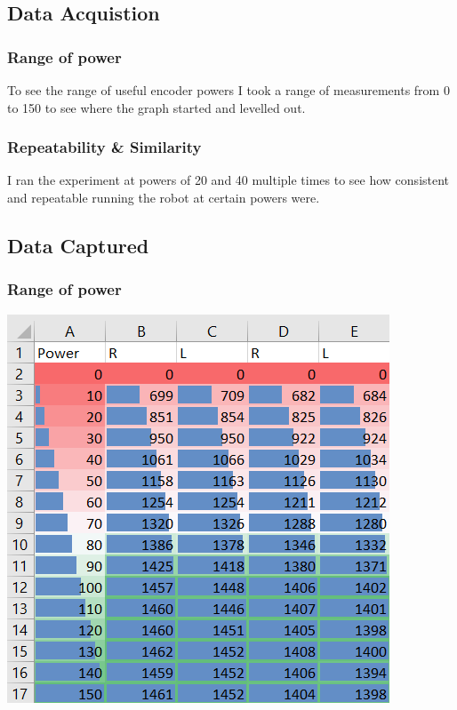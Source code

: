 \documentclass[11pt,a4paper,titlepage]{article}
\begin{document}
\subsection{Data Acquistion}
	\subsubsection{Range of power}
		To see the range of useful encoder powers I took a range of measurements from 0 to 150 to see where the graph started and levelled out.
	\subsubsection{Repeatability \& Similarity}
	I ran the experiment at powers of 20 and 40 multiple times to see how consistent and repeatable running the robot at certain powers were.
\subsection{Data Captured}
	\subsubsection{Range of power}
	\includegraphics{encoderaRange}
\end{document}

